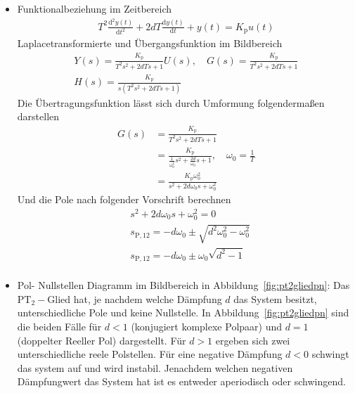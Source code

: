 \begin{itemize}
	\item Funktionalbeziehung im Zeitbereich
	\begin{equation*}
	\begin{aligned}
	T^{2}\frac{\text{d}^{2}y(t)}{\text{d}t^{2}}+2dT\frac{\text{d}y(t)}{\text{d}t}+y(t)=K_{\text{p}}u(t)
	\end{aligned}
	\end{equation*}
	Laplacetransformierte und Übergangsfunktion im Bildbereich
	\begin{equation*}
	\begin{aligned}
	Y(s)=\frac{K_{\text{p}}}{T^{2}s^{2}+2dTs+1}U(s),\quad G(s)=\frac{K_{\text{p}}}{T^{2}s^{2}+2dTs+1}\\ H(s)=\frac{K_{\text{p}}}{s\left(T^{2}s^{2}+2dTs+1\right)}
	\end{aligned}
	\end{equation*}
	Die Übertragungsfunktion lässt sich durch Umformung folgendermaßen darstellen
	\begin{equation*}
	\begin{aligned}
	G(s)&=\frac{K_{\text{p}}}{T^{2}s^{2}+2dTs+1}\\
	&=\frac{K_{\text{p}}}{\frac{1}{\omega^{2}_{0}}s^{2}+\frac{2d}{\omega_{0}}s+1}, \quad \omega_{0} = \frac{1}{T}\\
	&=\frac{K_{\text{p}}\omega^{2}_{0}}{s^{2}+2d\omega_{0}s+\omega^{2}_{0}}
	\end{aligned}
	\end{equation*}
	Und die Pole nach folgender Vorschrift berechnen
	\begin{equation*}
	\begin{aligned}
	&s^{2}+2d\omega_{0}s+\omega^{2}_{0}=0\\
	&s_{\text{P},12}=-d\omega_{0}\pm\sqrt{d^{2}\omega^{2}_{0}-\omega^{2}_{0}}\\
	&s_{\text{P},12}=-d\omega_{0}\pm\omega_{0}\sqrt{d^{2}-1}\\
	\end{aligned}
	\end{equation*}
	\item Pol- Nullstellen Diagramm im Bildbereich in Abbildung~\ref{fig:pt2gliedpn}: Das $\text{PT}_{2}-\text{Glied}$ hat, je nachdem welche Dämpfung $d$ das System besitzt, unterschiedliche Pole und keine Nullstelle. In Abbildung~\ref{fig:pt2gliedpn} sind die beiden Fälle für $d<1$ (konjugiert komplexe Polpaar) und $d=1$ (doppelter Reeller Pol) dargestellt. Für $d>1$ ergeben sich zwei unterschiedliche reele Polstellen. Für eine negative Dämpfung $d<0$ schwingt das system auf und wird instabil. Jenachdem welchen negativen Dämpfungwert das System hat ist es entweder aperiodisch oder schwingend.

\end{itemize}
